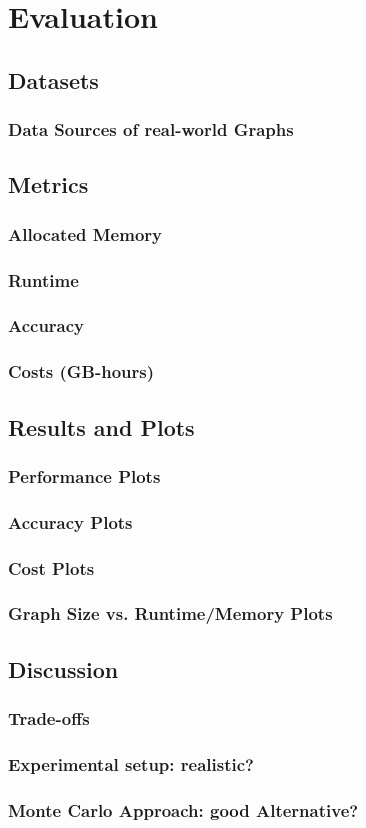 \section{Evaluation}


\subsection{Datasets}
\subsubsection{Data Sources of real-world Graphs}

\subsection{Metrics}
\subsubsection{Allocated Memory}
\subsubsection{Runtime}
\subsubsection{Accuracy}
\subsubsection{Costs (GB-hours)}

\subsection{Results and Plots}
\subsubsection{Performance Plots}
\subsubsection{Accuracy Plots}
\subsubsection{Cost Plots}
\subsubsection{Graph Size vs. Runtime/Memory Plots}

\subsection{Discussion}
\subsubsection{Trade-offs}
\subsubsection{Experimental setup: realistic?}
\subsubsection{Monte Carlo Approach: good Alternative?}
